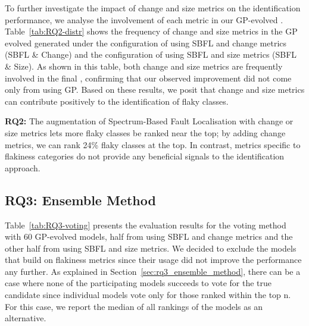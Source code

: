 To further investigate the impact of change and size metrics on the identification performance, we analyse the involvement of each metric in our GP-evolved \formulas. 
Table~\ref{tab:RQ2-distr} shows the frequency of change and size metrics in the GP evolved \formulas generated under the configuration of using SBFL and change metrics (\ie SBFL \& Change) and the configuration of using SBFL and size metrics (\ie SBFL \& Size). 
As shown in this table, both change and size metrics are frequently involved in the final \formulas, confirming that our observed improvement did not come only from using GP.
Based on these results, we posit that change and size metrics can contribute positively to the identification of flaky classes.

\begin{table}[ht]
\caption{Frequency of metrics in GP-evolved \formulas (from 0 to 1). `Changes' and `Dev' denote \textit{`Unique Changes'} and \textit{`Developers'}, respectively. The column `SBFL' contains the average frequency of the four SBFL metrics. 
\label{tab:RQ2-distr}}
\centering
{}
\end{table}


\begin{tcolorbox}[
    left=2pt,right=2pt,top=2pt,bottom=2pt,
    arc=0pt,
    boxrule=1.2pt
]
\textbf{RQ2:} 
The augmentation of Spectrum-Based Fault Localisation with change or size metrics lets more flaky classes be ranked near the top; by adding change metrics, we can rank 24\% flaky classes at the top. In contrast, metrics specific to flakiness categories do not provide any beneficial signals to the identification approach. 
\end{tcolorbox}

\subsection{RQ3: Ensemble Method}

Table~\ref{tab:RQ3-voting} presents the evaluation results for the voting method with 60 GP-evolved models, half from using SBFL and change metrics and the other half from using SBFL and size metrics.
We decided to exclude the models that build on flakiness metrics since their usage did not improve the performance any further.
As explained in Section~\ref{sec:rq3_ensemble_method}, there can be a case where none of the participating models succeeds to vote for the true candidate since individual models vote only for those ranked within the top n. For this case, we report the median of all rankings of the models as an alternative. 

